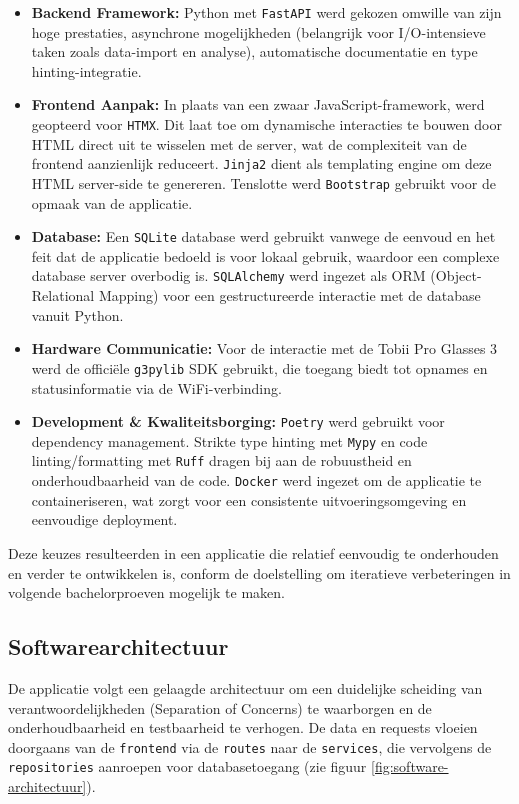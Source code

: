 \begin{itemize}
    \item \textbf{Backend Framework:} Python met \texttt{FastAPI} werd gekozen omwille van zijn hoge prestaties, asynchrone mogelijkheden (belangrijk voor I/O-intensieve taken zoals data-import en analyse), automatische documentatie en type hinting-integratie.
    \item \textbf{Frontend Aanpak:} In plaats van een zwaar JavaScript-framework, werd geopteerd voor \texttt{HTMX}. Dit laat toe om dynamische interacties te bouwen door HTML direct uit te wisselen met de server, wat de complexiteit van de frontend aanzienlijk reduceert. \texttt{Jinja2} dient als templating engine om deze HTML server-side te genereren. Tenslotte werd \texttt{Bootstrap} gebruikt voor de opmaak van de applicatie.
    \item \textbf{Database:} Een \texttt{SQLite} database werd gebruikt vanwege de eenvoud en het feit dat de applicatie bedoeld is voor lokaal gebruik, waardoor een complexe database server overbodig is. \texttt{SQLAlchemy} werd ingezet als ORM (Object-Relational Mapping) voor een gestructureerde interactie met de database vanuit Python.
    \item \textbf{Hardware Communicatie:} Voor de interactie met de Tobii Pro Glasses 3 werd de officiële \texttt{g3pylib} SDK gebruikt, die toegang biedt tot opnames en statusinformatie via de WiFi-verbinding.
    \item \textbf{Development \& Kwaliteitsborging:} \texttt{Poetry} werd gebruikt voor dependency management. Strikte type hinting met \texttt{Mypy} en code linting/formatting met \texttt{Ruff} dragen bij aan de robuustheid en onderhoudbaarheid van de code. \texttt{Docker} werd ingezet om de applicatie te containeriseren, wat zorgt voor een consistente uitvoeringsomgeving en eenvoudige deployment.
\end{itemize}
Deze keuzes resulteerden in een applicatie die relatief eenvoudig te onderhouden en verder te ontwikkelen is, conform de doelstelling om iteratieve verbeteringen in volgende bachelorproeven mogelijk te maken.

\subsection{Softwarearchitectuur}

De applicatie volgt een gelaagde architectuur om een duidelijke scheiding van verantwoordelijkheden (Separation of Concerns) te waarborgen en de onderhoudbaarheid en testbaarheid te verhogen. 
De data en requests vloeien doorgaans van de \texttt{frontend} via de \texttt{routes} naar de \texttt{services}, die vervolgens de \texttt{repositories} aanroepen voor databasetoegang (zie figuur \ref{fig:software-architectuur}).

